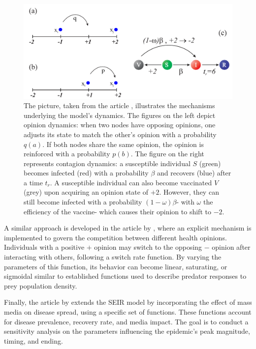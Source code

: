 \begin{figure}[h]
	\centering
	\includegraphics[width=0.8\linewidth]{0_introduction/images_review/alvarez_opi_vac}
	\caption[Rules in opinion disease model]{The picture, taken from the article \cite{Alvarez_Zuzek_2017}, illustrates the mechanisms underlying the model's dynamics. The figures on the left depict opinion dynamics: when two nodes have opposing opinions, one adjusts its state to match the other's opinion with a probability $q(a)$. If both nodes share the same opinion, the opinion is reinforced with a probability $p(b)$. The figure on the right represents contagion dynamics: a susceptible individual $S$ (green) becomes infected (red) with a probability $\beta$ and recovers (blue) after a time $t_r$. A susceptible individual can also become vaccinated $V$ (grey) upon acquiring an opinion state of $+2$. However, they can still become infected with a probability $(1-\omega) \beta$- with $\omega$ the efficiency of the vaccine- which causes their opinion to shift to $-2$. }
	\label{fig:alvarez_opi_vac}
\end{figure}

A similar approach is developed in the article by \cite{teslya2022}, where an explicit mechanism is implemented to govern the competition between different health opinions. Individuals with a positive $+$ opinion may switch to the opposing $-$ opinion after interacting with others, following a switch rate function. By varying the parameters of this function, its behavior can become linear, saturating, or sigmoidal similar to established functions used to describe predator responses to prey population density.

Finally, the article by \cite{Collinson2014} extends the SEIR model by incorporating the effect of mass media on disease spread, using a specific set of functions. These functions account for disease prevalence, recovery rate, and media impact. The goal is to conduct a sensitivity analysis on the parameters influencing the epidemic's peak magnitude, timing, and ending. 


